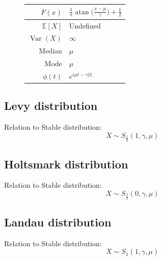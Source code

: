 \documentclass[a4paper,11pt]{article}
\theoremstyle{plain}
\theoremstyle{definition}
\newcommand{\ME}{\mathbb{E}}
\newcommand{\Var}{\operatorname{Var}}
\begin{document}
\begin{figure}[!htb]
\begin{minipage}{0.4\textwidth}
\begin{tabular}{| r | l |}
			\hline
			$F(x)$ & $ \frac{1}{\pi} \operatorname{atan}\Big( \frac{x-\mu}{\gamma} \Big) + \frac{1}{2} $ \\
			\hline
			$\ME[X]$ & Undefined \\
			\hline
			$\Var(X)$ & $\infty $\\
			\hline
			Median & $\mu$ \\
			\hline
			Mode & $\mu$ \\
			\hline
			$\phi(t)$ & $ e^{i\mu t - \gamma |t|}  $ \\
			\hline
		\end{tabular}
	    \end{minipage}
	\end{figure}
	
	
\subsection{Levy distribution}
	Relation to Stable distribution:
	\[X \sim S_{\frac{1}{2}}(1, \gamma, \mu) \]


\subsection{Holtsmark distribution}
	Relation to Stable distribution:
	\[X \sim S_{\frac{3}{2}}(0, \gamma, \mu) \]


\subsection{Landau distribution}
	Relation to Stable distribution:
	\[X \sim S_{1}(1, \gamma, \mu) \]
	
	
	\pagebreak
\end{document}
